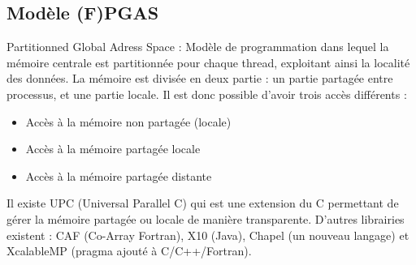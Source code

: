 \documentclass{article}
\begin{document}
\subsection{Modèle (F)PGAS}
Partitionned Global Adress Space : Modèle de programmation dans lequel la mémoire centrale est partitionnée pour chaque thread, exploitant ainsi la localité des données.
La mémoire est divisée en deux partie : un partie partagée entre processus, et une partie locale. Il est donc possible d'avoir trois accès différents :
\begin{itemize}
\item Accès à la mémoire non partagée (locale)
\item Accès à la mémoire partagée locale
\item Accès à la mémoire partagée distante
\end{itemize}


Il existe UPC (Universal Parallel C) qui est une extension du C permettant de gérer la mémoire partagée ou locale de manière transparente. D'autres librairies existent : CAF (Co-Array Fortran), X10 (Java), Chapel (un nouveau langage) et XcalableMP (pragma ajouté à C/C++/Fortran).
\end{document}
